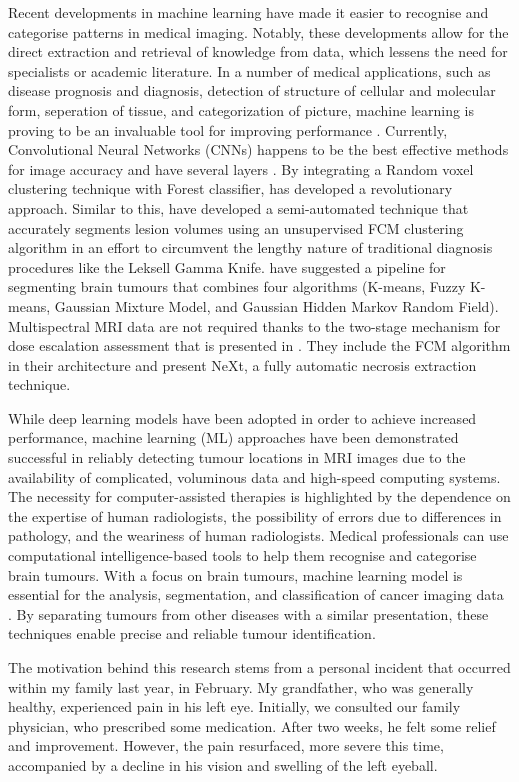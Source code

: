 \documentclass[12pt, a4paper,twoside]{report}
\theoremstyle{plain} %
\theoremstyle{definition} %
\theoremstyle{remark} %
\numberwithin{equation}{chapter}
\begin{document}
Recent developments in machine learning have made it easier to recognise and categorise patterns in medical imaging. Notably, these developments allow for the direct extraction and retrieval of knowledge from data, which lessens the need for specialists or academic literature. In a number of medical applications, such as disease prognosis and diagnosis, detection of structure of cellular and molecular form, seperation of tissue, and categorization of picture, machine learning is proving to be an invaluable tool for improving performance \cite{militello15}. Currently, Convolutional Neural Networks (CNNs) happens to be the best effective methods for image accuracy and have several layers \cite{juan15}. By integrating a Random voxel clustering technique with Forest classifier, \cite{bonte18} has developed a revolutionary approach. Similar to this, \cite{militello15} have developed a semi-automated technique that accurately segments lesion volumes using an unsupervised FCM clustering algorithm in an effort to circumvent the lengthy nature of traditional diagnosis procedures like the Leksell Gamma Knife. \cite{xie22} have suggested a pipeline for segmenting brain tumours that combines four algorithms (K-means, Fuzzy K-means, Gaussian Mixture Model, and Gaussian Hidden Markov Random Field). Multispectral MRI data are not required thanks to the two-stage mechanism for dose escalation assessment that is presented in \cite{rundo18}. They include the FCM algorithm in their architecture and present NeXt, a fully automatic necrosis extraction technique.

While deep learning models have been adopted in order to achieve increased performance, machine learning (ML) approaches have been demonstrated successful in reliably detecting tumour locations in MRI images due to the availability of complicated, voluminous data and high-speed computing systems. The necessity for computer-assisted therapies is highlighted by the dependence on the expertise of human radiologists, the possibility of errors due to differences in pathology, and the weariness of human radiologists. Medical professionals can use computational intelligence-based tools to help them recognise and categorise brain tumours. With a focus on brain tumours, machine learning model is essential for the analysis, segmentation, and classification of cancer imaging data \cite{jin17}. By separating tumours from other diseases with a similar presentation, these techniques enable precise and reliable tumour identification. 

The motivation behind this research stems from a personal incident that occurred within my family last year, in February. My grandfather, who was generally healthy, experienced pain in his left eye. Initially, we consulted our family physician, who prescribed some medication. After two weeks, he felt some relief and improvement. However, the pain resurfaced, more severe this time, accompanied by a decline in his vision and swelling of the left eyeball.
\end{document}
